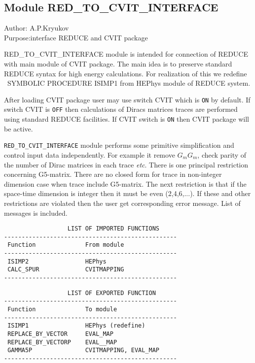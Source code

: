 \subsection*{Module RED\_TO\_CVIT\_INTERFACE}

\begin{center}
Author: A.P.Kryukov \\
Purpose:interface REDUCE and CVIT package
\end{center}

RED\_TO\_CVIT\_INTERFACE module is intended for connection of REDUCE
with main module of CVIT package. The main idea is to preserve
standard REDUCE syntax for high energy calculations.  For realization
of this we redefine {\ SYMBOLIC PROCEDURE ISIMP1} from HEPhys module of
REDUCE system.

After loading CVIT package user may use switch CVIT which is {\tt ON} by
default.  If switch CVIT is {\tt OFF} then calculations of Diracs matrices
traces are performed using standard REDUCE facilities. If CVIT switch
is {\tt ON} then CVIT package will be active.

{\tt RED\_TO\_CVIT\_INTERFACE} module performs some primitive simplification
and control input data independently.  For example it remove $G_mG_m$,
check parity of the number of Dirac matrices in each trace \emph{etc}.
There is one principal restriction concerning G5-matrix. There are no
closed form for trace in non-integer dimension case when trace include
G5-matrix.  The next restriction is that if the space-time dimension
is integer then it must be even (2,4,6,...).  If these and other
restrictions are violated then the user get corresponding error
message. List of messages is included.

\begin{center}
\begin{verbatim}
                  LIST OF IMPORTED FUNCTIONS
-------------------------------------------------
 Function              From module
-------------------------------------------------
 ISIMP2                HEPhys
 CALC_SPUR             CVITMAPPING
-------------------------------------------------
\end{verbatim}

\begin{verbatim}
                  LIST OF EXPORTED FUNCTION
-------------------------------------------------
 Function              To module
-------------------------------------------------
 ISIMP1                HEPhys (redefine)
 REPLACE_BY_VECTOR     EVAL_MAP
 REPLACE_BY_VECTORP    EVAL__MAP
 GAMMA5P               CVITMAPPING, EVAL_MAP
-------------------------------------------------
\end{verbatim}
\end{center}



